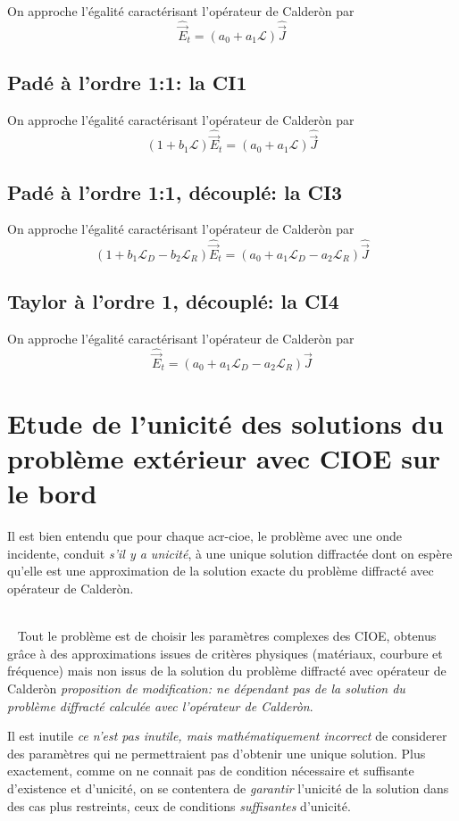 \documentclass[12pt,%
    twoside,%
    a4paper,%
    openright, %
    ]{book}
\numberwithin{equation}{section} %
\newcommand{\vect}[1]{{\overset{\rightarrow}{#1}}}
\newcommand{\LD}{{\mathcal{L}_D}}
\newcommand{\LL}{\mathcal{L}}
\newcommand{\LR}{{\mathcal{L}_R}}
\newcommand{\vE}{\vect{E}}
\newcommand{\vJ}{\vect{J}}
\begin{document}
    On approche l'égalité caractérisant l'opérateur de Calderòn par
    \[
      \hat\vE_t = ( a_0 + a_1 \LL ) \hat \vJ
    \]

  \subsection{Padé à l'ordre 1:1: la CI1}

    On approche l'égalité caractérisant l'opérateur de Calderòn par
    \[
      ( 1 + b_1 \LL )\hat\vE_t = ( a_0 + a_1 \LL ) \hat \vJ
    \]

  \subsection{Padé à l'ordre 1:1, découplé: la CI3}

    On approche l'égalité caractérisant l'opérateur de Calderòn par
    \[
      ( 1 + b_1 \LD -b_2 \LR )\hat\vE_t = ( a_0 + a_1 \LD -a_2 \LR) \hat \vJ
    \]

  \subsection{Taylor à l'ordre 1, découplé: la CI4}

    On approche l'égalité caractérisant l'opérateur de Calderòn par
    \[
      \hat\vE_t = ( a_0 + a_1 \LD - a_2 \LR ) \hat \vJ
    \]

\section{Etude de l'unicité des solutions du problème extérieur avec CIOE sur le bord}

  Il est bien entendu que pour chaque \gls{acr-cioe}, le problème avec une onde incidente, conduit \emph{s'il y a unicité}, à une unique solution diffractée dont on espère qu'elle est une approximation de la solution exacte du problème diffracté avec opérateur de Calderòn.

  {~}\\{~}
  Tout le problème est de choisir les paramètres complexes des CIOE, obtenus grâce à des approximations issues de critères physiques (matériaux, courbure et fréquence) mais non issus de la solution du problème diffracté avec opérateur de Calderòn {\it proposition de modification: ne dépendant pas de la solution du problème diffracté calculée avec l'opérateur de Calderòn}. 

  Il est inutile {\it ce n'est pas inutile, mais mathématiquement incorrect} de considerer des paramètres qui ne permettraient pas d'obtenir une unique solution.
  Plus exactement, comme on ne connait pas de condition nécessaire et suffisante d'existence et d'unicité, on se contentera de \emph{garantir} l'unicité de la solution dans des cas plus restreints, ceux de conditions \emph{suffisantes} d'unicité.
\end{document}
